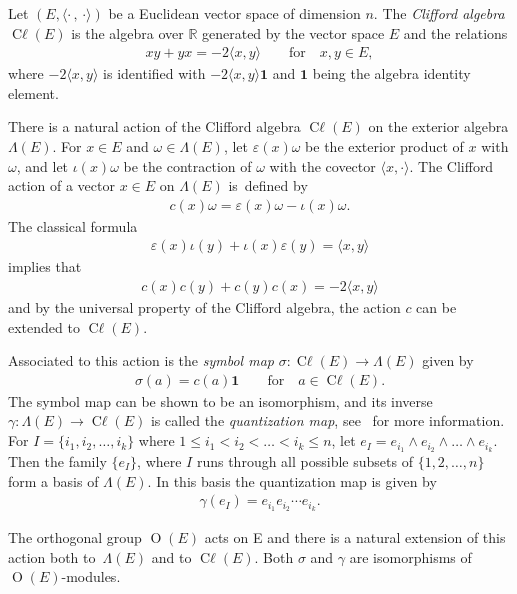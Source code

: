 \documentclass[pdftex]{sigma}
\DeclareMathOperator{\cl}{C\ell} %
\DeclareMathOperator{\Or}{O}
\numberwithin{equation}{section}
\begin{document}
Let $(E, \langle \cdot\,,\,\cdot\rangle)$ be a Euclidean vector space of dimension $n$. The \emph{Clifford algebra} $\cl(E)$ is the algebra over $\mathbb R$ generated by the vector space $E$ and the relations
\begin{gather*}
xy +yx=-2\langle x,y\rangle\qquad \text{for}\quad x, y \in E,
\end{gather*}
where $-2\langle x,y\rangle$ is identified with $-2\langle x,y\rangle \mathbf{1}$ and $\mathbf{1}$ being the algebra identity element.

There is a natural action of the Clifford algebra $\cl(E)$ on the exterior algebra $\Lambda(E)$. For $x\in E $ and $\omega\in \Lambda(E)$, let $\varepsilon(x)\omega$ be the exterior product of $x$ with $\omega$, and let $\iota(x)\omega$ be the contraction of $\omega$ with the covector $\langle x, \cdot\rangle$. The Clifford action of a vector $x\in E$ on $\Lambda(E)$ is~defined by
\begin{gather*}
c(x) \omega = \varepsilon(x) \omega - \iota(x) \omega.
\end{gather*}
The classical formula
\begin{gather*}\varepsilon(x) \iota(y) + \iota(x) \varepsilon(y) = \langle x,y\rangle
\end{gather*}
implies that
\begin{gather*}
c(x)c(y)+c(y)c(x) = -2\langle x,y\rangle
\end{gather*}
and by the universal property of the Clifford algebra, the action $c$ can be extended to $\cl(E)$.

Associated to this action is the \emph{symbol map} $\sigma \colon \cl(E) \to \Lambda(E)$ given by
\begin{gather*}
\sigma(a) = c(a) \mathbf{1}\qquad \text{for}\quad a \in \cl(E).
\end{gather*}
The symbol map can be shown to be an isomorphism, and its inverse $\gamma \colon \Lambda(E) \to \cl(E)$ is called the \emph{quantization map}, see~\cite{bgv} for more information. For $I=\{ i_1, i_2,\dots,i_k\}$ where $1\leq i_1<i_2<\dots<i_k\leq n$, let $e_I = e_{i_1}\wedge e_{i_2}\wedge\dots\wedge e_{i_k}$. Then the family $\{e_I\}$, where $I$ runs through all possible subsets of $\{1,2,\dots,n\}$ form a basis of $\Lambda(E)$. In this basis the quantization map is given by
\begin{gather}\label{gamma}
\gamma(e_I) =e_{i_1}e_{i_2}\cdots e_{i_k}.
\end{gather}

The orthogonal group $\Or(E)$ acts on E and there is a natural extension of this action both to~$\Lambda(E)$ and to $\cl(E)$. Both $\sigma$ and $\gamma$ are isomorphisms of $\Or(E)$-modules.
\end{document}
